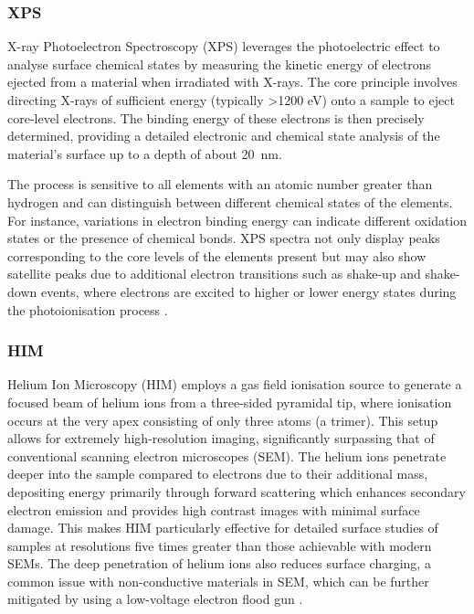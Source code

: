 \begin{refsection}
\subsubsection{XPS}
X-ray Photoelectron Spectroscopy (XPS) leverages the photoelectric effect to analyse surface chemical states by measuring the kinetic energy of electrons ejected from a material when irradiated with X-rays. The core principle involves directing X-rays of sufficient energy (typically >1200 eV) onto a sample to eject core-level electrons. The binding energy of these electrons is then precisely determined, providing a detailed electronic and chemical state analysis of the material's surface up to a depth of about 20~\si{\nano\metre}.

The process is sensitive to all elements with an atomic number greater than hydrogen and can distinguish between different chemical states of the elements. For instance, variations in electron binding energy can indicate different oxidation states or the presence of chemical bonds. XPS spectra not only display peaks corresponding to the core levels of the elements present but may also show satellite peaks due to additional electron transitions such as shake-up and shake-down events, where electrons are excited to higher or lower energy states during the photoionisation process \cite{Morgan2012XRayPS}.

\subsubsection{HIM}
Helium Ion Microscopy (HIM) employs a gas field ionisation source to generate a focused beam of helium ions from a three-sided pyramidal tip, where ionisation occurs at the very apex consisting of only three atoms (a trimer). This setup allows for extremely high-resolution imaging, significantly surpassing that of conventional scanning electron microscopes (SEM). The helium ions penetrate deeper into the sample compared to electrons due to their additional mass, depositing energy primarily through forward scattering which enhances secondary electron emission and provides high contrast images with minimal surface damage. This makes HIM particularly effective for detailed surface studies of samples at resolutions five times greater than those achievable with modern SEMs. The deep penetration of helium ions also reduces surface charging, a common issue with non-conductive materials in SEM, which can be further mitigated by using a low-voltage electron flood gun \cite{Joens2013}.


\end{refsection}
